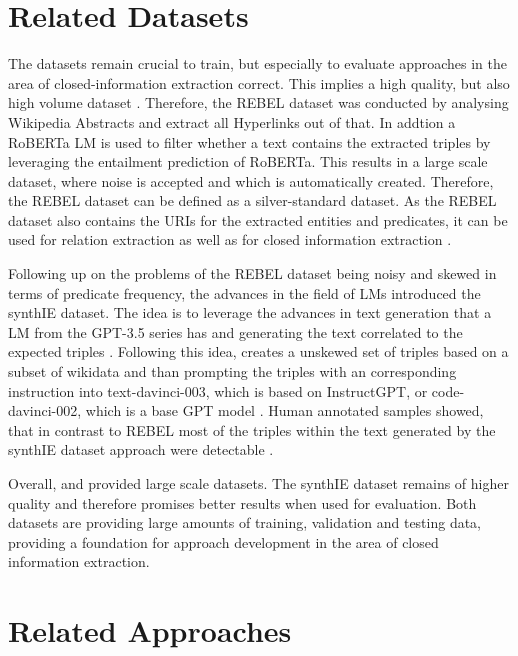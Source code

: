 \documentclass[a4paper,oneside,bibliography=totoc]{scrbook}
\begin{document}
\section{Related Datasets}
\label{sec:related_datasets}

The datasets remain crucial to train, but especially to evaluate approaches in the area of closed-information extraction correct. This implies a high quality, but also high volume dataset \cite{Josifoski2023}. Therefore, the REBEL dataset was conducted by analysing Wikipedia Abstracts and extract all Hyperlinks out of that. In addtion a RoBERTa \ac{LM} is used to filter whether a text contains the extracted triples by leveraging the entailment prediction of RoBERTa. This results in a large scale dataset, where noise is accepted and which is automatically created. Therefore, the REBEL dataset can be defined as a silver-standard dataset. As the REBEL dataset also contains the \acp{URI} for the extracted entities and predicates, it can be used for relation extraction as well as for closed information extraction \cite{HuguetCabot2021}.

Following up on the problems of the REBEL dataset being noisy and skewed in terms of predicate frequency, the advances in the field of \acp{LM} \citet{Josifoski2023} introduced the synthIE dataset. The idea is to leverage the advances in text generation that a \ac{LM} from the GPT-3.5 series has and generating the text correlated to the expected triples \cite{Josifoski2023}. Following this idea, \citet{Josifoski2023} creates a unskewed set of triples based on a subset of wikidata and than prompting the triples with an corresponding instruction into text-davinci-003, which is based on InstructGPT, or code-davinci-002, which is a base GPT model \cite{Josifoski2023,OpenAI2025a}. Human annotated samples showed, that in contrast to REBEL most of the triples within the text generated by the synthIE dataset approach were detectable \cite{Josifoski2023}.

Overall, \citet{HuguetCabot2021} and \cite{Josifoski2023} provided large scale datasets. The synthIE dataset remains of higher quality and therefore promises better results when used for evaluation. Both datasets are providing large amounts of training, validation and testing data, providing a foundation for approach development in the area of closed information extraction.

\section{Related Approaches}
\label{sec:related_approaches}
\end{document}
